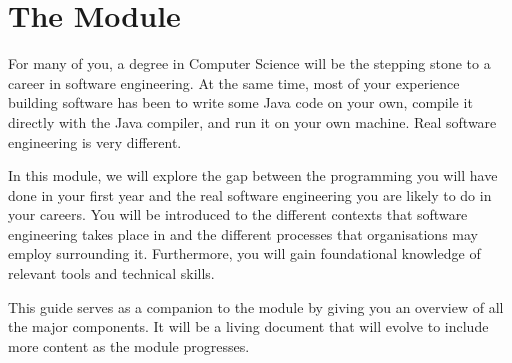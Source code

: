 
\chapter{The Module}

For many of you, a degree in Computer Science will be the stepping stone to a career in software engineering. At the same time, most of your experience building software has been to write some Java code on your own, compile it directly with the Java compiler, and run it on your own machine. Real software engineering is very different.

In this module, we will explore the gap between the programming you will have done in your first year and the real software engineering you are likely to do in your careers. You will be introduced to the different contexts that software engineering takes place in and the different processes that organisations may employ surrounding it. Furthermore, you will gain foundational knowledge of relevant tools and technical skills.

This guide serves as a companion to the module by giving you an overview of all the major components. It will be a living document that will evolve to include more content as the module progresses.

